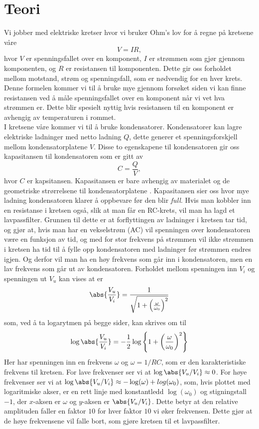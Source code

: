 \documentclass[%
 reprint,
 amsmath,amssymb,
 aps,
]{revtex4-1}
\begin{document}
\section{\label{teori}Teori}
Vi jobber med elektriske kretser hvor vi bruker Ohm's lov \cite{skaar} for å regne på kretsene våre
\begin{equation}
  V = IR \label{ohm},
\end{equation}
hvor $V$ er spenningsfallet over en komponent, $I$ er strømmen som gjør gjennom komponenten, og $R$ er resistansen til komponenten. Dette gir oss forholdet mellom motstand, strøm og spenningsfall, som er nødvendig for en hver krets. Denne formelen kommer vi til å bruke mye gjennom forsøket siden vi kan finne resistansen ved å måle spenningsfallet over en komponent når vi vet hva strømmen er. Dette blir spesielt nyttig hvis resistansen til en komponent er avhengig av temperaturen i rommet. \\
I kretsene våre kommer vi til å bruke kondensatorer. Kondensatorer kan lagre elektriske ladninger med netto ladning $Q$, dette generer et spenningsforskjell mellom kondensatorplatene $V$. Disse to egenskapene til kondensatoren gir oss kapasitansen til kondensatoren som er gitt av
\begin{equation}
  C = \frac{Q}{V},
\end{equation}
hvor $C$ er kapsitansen. Kapasitansen er bare avhengig av materialet og de geometriske strørrelsene til kondensatorplatene \cite{skaar}. Kapasitansen sier oss hvor mye ladning kondensatoren klarer å oppbevare før den blir \textit{full}. Hvis man kobbler inn en resistanse i kretsen også, slik at man får en RC-krets, vil man ha lagd et lavpassfilter. Grunnen til dette er at forflyttingen av ladninger i kretsen tar tid, og gjør at, hvis man har en vekselstrøm (AC) vil spenningen over kondensatoren være en funksjon av tid, og med for stor frekvens på strømmen vil ikke strømmen i kretsen ha tid til å fylle opp kondensatoren med ladninger før strømmen endres igjen. Og derfor vil man ha en høy frekvens som går inn i kondensatoren, men en lav frekvens som går ut av kondensatoren. Forholdet mellom spenningen inn $V_i$ og spenningen ut $V_u$ kan vises at \cite{oppgave} er
\begin{equation}
  \abs{\frac{V_u}{V_i}} = \frac{1}{\sqrt{1+\left(\frac{\omega}{\omega_0}\right)^2}}
\end{equation}som, ved å ta logarytmen på begge sider, kan skrives om til
\begin{equation}
  \log\abs{\frac{V_u}{V_i}} = -\frac{1}{2}\log\left\{1+\left(\frac{\omega}{\omega_0}\right)^2 \right\}
\end{equation}
Her har spenningen inn en frekvens $\omega$ og $\omega = 1/RC$, som er den karakteristiske frekvens til kretsen. For lave frekvenser ser vi at $\log\abs{V_u/V_i}\approx 0$. For høye frekvenser ser vi at $\log\abs{V_u/V_i}\approx -\log(\omega) + log(\omega_0)$, som, hvis plottet med logaritmiske akser, er en rett linje med konstantledd $\log(\omega_0)$ og stigningstall $-1$, der $x$-aksen er $\omega$ og $y$-aksen er $\abs{V_u/V_i}$. Dette betyr at den relative amplituden faller en faktor $10$ for hver faktor $10$ vi øker frekvensen. Dette gjør at de høye frekvensene vil falle bort, som gjøre kretsen til et lavpassfilter.
\end{document}
